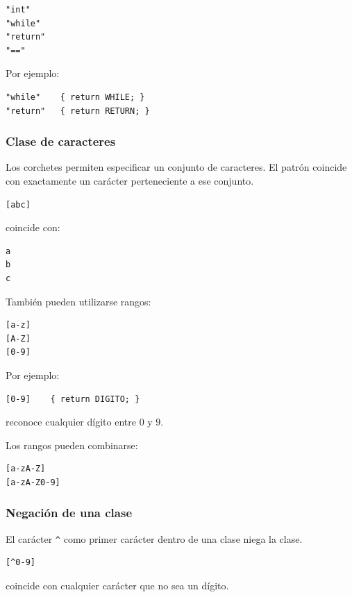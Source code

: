 \documentclass{article}
\begin{document}
\begin{verbatim}
"int"
"while"
"return"
"=="
\end{verbatim}

Por ejemplo:

\begin{verbatim}
"while"    { return WHILE; }
"return"   { return RETURN; }
\end{verbatim}

\subsubsection{Clase de caracteres}

Los corchetes permiten especificar un conjunto de caracteres. El patrón
coincide con exactamente un carácter perteneciente a ese conjunto.

\begin{verbatim}
[abc]
\end{verbatim}

coincide con:

\begin{verbatim}
a
b
c
\end{verbatim}

También pueden utilizarse rangos:

\begin{verbatim}
[a-z]
[A-Z]
[0-9]
\end{verbatim}

Por ejemplo:

\begin{verbatim}
[0-9]    { return DIGITO; }
\end{verbatim}

reconoce cualquier dígito entre $0$ y $9$.

Los rangos pueden combinarse:

\begin{verbatim}
[a-zA-Z]
[a-zA-Z0-9]
\end{verbatim}

\subsubsection{Negación de una clase}

El carácter \texttt{\^{}} como primer carácter dentro de una clase niega
la clase.

\begin{verbatim}
[^0-9]
\end{verbatim}

coincide con cualquier carácter que no sea un dígito.
\end{document}
